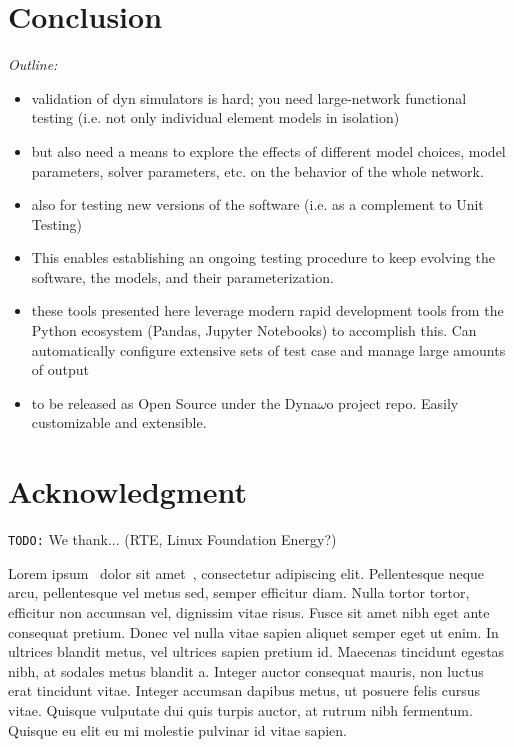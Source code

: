 \documentclass[conference]{IEEEtran}
\newcommand{\TODO}{\texttt{TODO:}\xspace}
\begin{document}
\section{Conclusion}

\begin{center}
  \itshape Outline:
  \begin{itemize}
    \item validation of dyn simulators is hard; you need large-network
          functional testing (i.e. not only individual element models in isolation)
    \item but also need a means to explore the effects of different model
          choices, model parameters, solver parameters, etc. on the behavior
          of the whole network.
    \item also for testing new versions of the software (i.e. as a
          complement to Unit Testing)
    \item This enables establishing an ongoing testing procedure to keep
          evolving the software, the models, and their parameterization.
    \item these tools presented here leverage modern rapid development
          tools from the Python ecosystem (Pandas, Jupyter Notebooks) to
          accomplish this. Can automatically configure extensive sets of test
          case and manage large amounts of output
    \item to be released as Open Source under the Dyna$\omega$o project
          repo. Easily customizable and extensible.
  \end{itemize}
\end{center}




\section*{Acknowledgment}

\TODO We thank...  (RTE, Linux Foundation Energy?)

Lorem ipsum~\cite{Fabozzi09} dolor sit amet~\cite{Fabozzi11}, consectetur
adipiscing elit. Pellentesque neque arcu, pellentesque vel metus sed, semper
efficitur diam. Nulla tortor tortor, efficitur non accumsan vel, dignissim vitae
risus. Fusce sit amet nibh eget ante consequat pretium. Donec vel nulla vitae
sapien aliquet semper eget ut enim. In ultrices blandit metus, vel ultrices
sapien pretium id. Maecenas tincidunt egestas nibh, at sodales metus blandit
a. Integer auctor consequat mauris, non luctus erat tincidunt vitae. Integer
accumsan dapibus metus, ut posuere felis cursus vitae. Quisque vulputate dui
quis turpis auctor, at rutrum nibh fermentum. Quisque eu elit eu mi molestie
pulvinar id vitae sapien.






\end{document}
